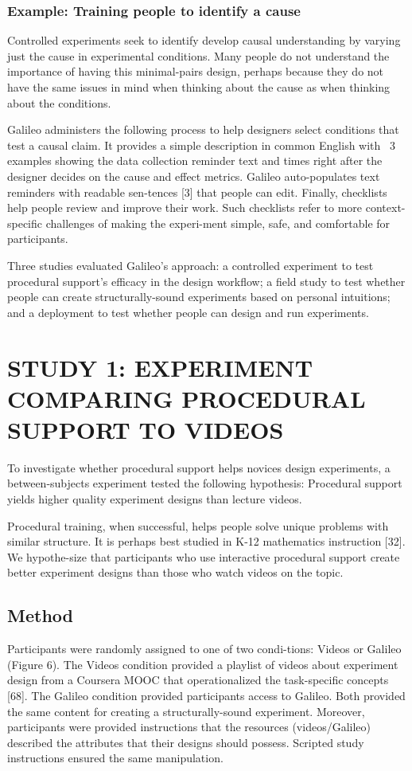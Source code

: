 \subsubsection{Example: Training people to identify a cause}
Controlled experiments seek to identify develop causal understanding by varying just the cause in experimental conditions. Many people do not understand the importance of having this minimal-pairs design, perhaps because they do not have the same issues in mind when thinking about the cause as when thinking about the conditions.

Galileo administers the following process to help designers select conditions that test a causal claim. It provides a simple description in common English with ~3 examples showing the data collection reminder text and times right after the designer decides on the cause and effect metrics. Galileo auto-populates text reminders with readable sen-tences [3] that people can edit. Finally, checklists help people review and improve their work. Such checklists refer to more context-specific challenges of making the experi-ment simple, safe, and comfortable for participants.
 
Three studies evaluated Galileo’s approach: a controlled experiment to test procedural support’s efficacy in the design workflow; a field study to test whether people can create structurally-sound experiments based on personal intuitions; and a deployment to test whether people can design and run experiments. 

\section{STUDY 1: EXPERIMENT COMPARING PROCEDURAL SUPPORT TO VIDEOS}
To investigate whether procedural support helps novices design experiments, a between-subjects experiment tested the following hypothesis: Procedural support yields higher quality experiment designs than lecture videos. 

Procedural training, when successful, helps people solve unique problems with similar structure. It is perhaps best studied in K-12 mathematics instruction [32]. We hypothe-size that participants who use interactive procedural support create better experiment designs than those who watch videos on the topic. 

\subsection{Method}
Participants were randomly assigned to one of two condi-tions: Videos or Galileo (Figure 6). The Videos condition provided a playlist of videos about experiment design from a Coursera MOOC that operationalized the task-specific concepts [68]. The Galileo condition provided participants access to Galileo. Both provided the same content for creating a structurally-sound experiment. Moreover, participants were provided instructions that the resources (videos/Galileo) described the attributes that their designs should possess. Scripted study instructions ensured the same manipulation. 

